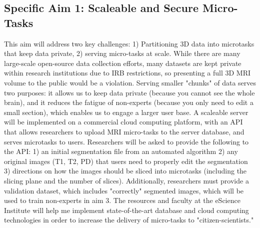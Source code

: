 \subsection*{Specific Aim 1: Scaleable and Secure Micro-Tasks}

This aim will address two key challenges: 1) Partitioning 3D data into microtasks that keep data private, 2) serving micro-tasks at scale. While there are many large-scale open-source data collection efforts, many datasets are kept private within research institutions due to  IRB restrictions, so presenting a full 3D MRI volume to the public would be a violation. Serving smaller "chunks" of data serves two purposes: it allows us to keep data private (because you cannot see the whole brain), and it reduces the fatigue of non-experts (because you only need to edit a small section), which enables us to engage a larger user base. A scaleable server will be implemented on a commercial cloud computing platform, with an API that allows researchers to upload MRI micro-tasks to the server database, and serves microtasks to users. Researchers will be asked to provide the following to the API: 1) an initial segmentation file from an automated algorithm 2) any original images (T1, T2, PD) that users need to properly edit the segmentation 3) directions on how the images should be sliced into microtasks (including the slicing plane and the number of slices). Additionally, researchers must provide a validation dataset, which includes "correctly" segmented images, which will be used to train non-experts in aim 3. The resources and faculty at the eScience Institute will help me implement state-of-the-art database and cloud computing technologies in order to increase the delivery of micro-tasks to "citizen-scientists."